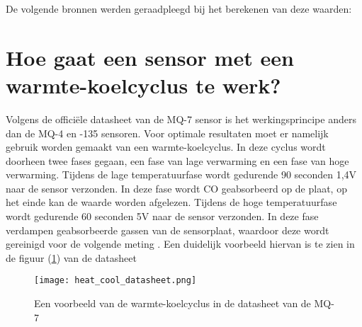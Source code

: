De volgende bronnen werden geraadpleegd bij het berekenen van deze waarden:



\section{Hoe gaat een sensor met een warmte-koelcyclus te werk?}%
\label{sec:warmte-koelcyclus}


Volgens de officiële datasheet van de MQ-7 sensor is het werkingsprincipe anders dan de MQ-4 en -135 sensoren. Voor optimale resultaten moet er namelijk gebruik worden gemaakt van een warmte-koelcyclus. In deze cyclus wordt doorheen twee fases gegaan, een fase van lage verwarming en een fase van hoge verwarming. Tijdens de lage temperatuurfase wordt gedurende 90 seconden 1,4V naar de sensor verzonden. In deze fase wordt CO geabsorbeerd op de plaat, op het einde kan de waarde worden afgelezen. Tijdens de hoge temperatuurfase wordt gedurende 60 seconden 5V naar de sensor verzonden. In deze fase verdampen geabsorbeerde gassen van de sensorplaat, waardoor deze wordt gereinigd voor de volgende meting
. Een duidelijk voorbeeld hiervan is te zien in de figuur (\ref{fig:heat_cool_datasheet}) van de datasheet

\begin{figure}[h]
    \texttt{[image: heat\_cool\_datasheet.png]}
    \caption[Warmte-koelcyclus MQ-7]{Een voorbeeld van de warmte-koelcyclus in de datasheet van de MQ-7
    }
    \label{fig:heat_cool_datasheet}
\end{figure}


